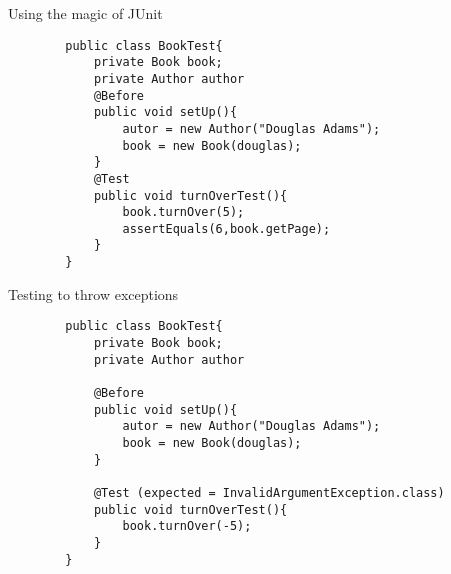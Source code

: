 \begin{frame}[fragile]{Using the magic of JUnit}
	\begin{lstlisting}
		public class BookTest{
			private Book book;
			private Author author
			@Before
			public void setUp(){
				autor = new Author("Douglas Adams");
				book = new Book(douglas);	
			}
			@Test
			public void turnOverTest(){
				book.turnOver(5);
				assertEquals(6,book.getPage);
			}
		}
	\end{lstlisting}
\end{frame}

\begin{frame}[fragile]{Testing to throw exceptions}
	\begin{lstlisting}
		public class BookTest{
			private Book book;
			private Author author
			
			@Before
			public void setUp(){
				autor = new Author("Douglas Adams");
				book = new Book(douglas);	
			}
			
			@Test (expected = InvalidArgumentException.class)
			public void turnOverTest(){
				book.turnOver(-5);
			}
		}
	\end{lstlisting}
\end{frame}


